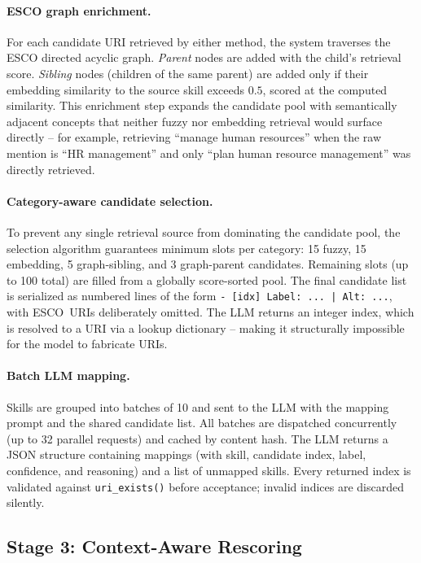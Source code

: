 \documentclass[11pt]{article}
\begin{document}
\paragraph{ESCO graph enrichment.}
For each candidate URI retrieved by either method, the system traverses the ESCO directed acyclic graph. \emph{Parent} nodes are added with the child's retrieval score. \emph{Sibling} nodes (children of the same parent) are added only if their embedding similarity to the source skill exceeds $0.5$, scored at the computed similarity. This enrichment step expands the candidate pool with semantically adjacent concepts that neither fuzzy nor embedding retrieval would surface directly -- for example, retrieving ``manage human resources'' when the raw mention is ``HR management'' and only ``plan human resource management'' was directly retrieved.

\paragraph{Category-aware candidate selection.}
To prevent any single retrieval source from dominating the candidate pool, the selection algorithm guarantees minimum slots per category: 15 fuzzy, 15 embedding, 5 graph-sibling, and 3 graph-parent candidates. Remaining slots (up to 100 total) are filled from a globally score-sorted pool. The final candidate list is serialized as numbered lines of the form \texttt{- [idx] Label: ... | Alt: ...}, with ESCO~URIs deliberately omitted. The LLM returns an integer index, which is resolved to a URI via a lookup dictionary -- making it structurally impossible for the model to fabricate URIs.

\paragraph{Batch LLM mapping.}
Skills are grouped into batches of 10 and sent to the LLM with the mapping prompt and the shared candidate list. All batches are dispatched concurrently (up to 32 parallel requests) and cached by content hash. The LLM returns a JSON structure containing mappings (with skill, candidate index, label, confidence, and reasoning) and a list of unmapped skills. Every returned index is validated against \texttt{uri\_exists()} before acceptance; invalid indices are discarded silently.

\subsection{Stage 3: Context-Aware Rescoring}
\label{sec:stage3}
\end{document}
